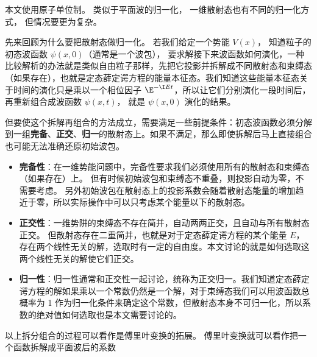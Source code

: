 

本文使用原子单位制。 类似于平面波的归一化， 一维散射态也有不同的归一化方式， 但情况要更为复杂。

先来回顾为什么要把散射态做归一化。 若我们给定一个势能 $V(x)$， 知道粒子的初态波函数 $\psi(x, 0)$（通常是一个波包）， 要求解接下来波函数如何演化，一种比较解析的办法就是类似自由粒子那样，先把它投影并拆解成不同散射态和束缚态（如果存在），也就是定态薛定谔方程的能量本征态。我们知道这些能量本征态关于时间的演化只是乘以一个相位因子 $\E^{-\I Et}$，所以让它们分别演化一段时间后，再重新组合成波函数 $\psi(x, t)$， 就是 $\psi(x, 0)$ 演化的结果。

但要使这个拆解再组合的方法成立，需要满足一些前提条件：初态波函数必须分解到一组\textbf{完备}、\textbf{正交}、\textbf{归一}的散射态上。如果不满足，那么即使拆解后马上直接组合也可能无法准确还原初始波包。
\begin{itemize}
\item \textbf{完备性}：在一维势能问题中，完备性要求我们必须使用所有的散射态和束缚态（如果存在）上。 但有时候初始波包和束缚态不重叠，则投影自动为零，不需要考虑。 另外初始波包在散射态上的投影系数会随着散射态能量的增加趋近于零，所以实际操作中可以只考虑某个能量以下的散射态。
\item \textbf{正交性}：一维势阱的束缚态不存在简并，自动两两正交，且自动与所有散射态正交。 但散射态存在二重简并，也就是对于定态薛定谔方程的某个能量 $E$，存在两个线性无关的解，选取时有一定的自由度。本文讨论的就是如何选取这两个线性无关的解使它们正交。
\item \textbf{归一性}：归一性通常和正交性一起讨论，统称为正交归一。我们知道定态薛定谔方程的解如果乘以一个常数仍然是一个解，对于束缚态我们可以用波函数总概率为 1 作为归一化条件来确定这个常数，但散射态本身不可归一化，所以系数的绝对值如何选取也是本文需要讨论的。
\end{itemize}

以上拆分组合的过程可以看作是傅里叶变换的拓展。 傅里叶变换就可以看作把一个函数拆解成平面波后的系数

